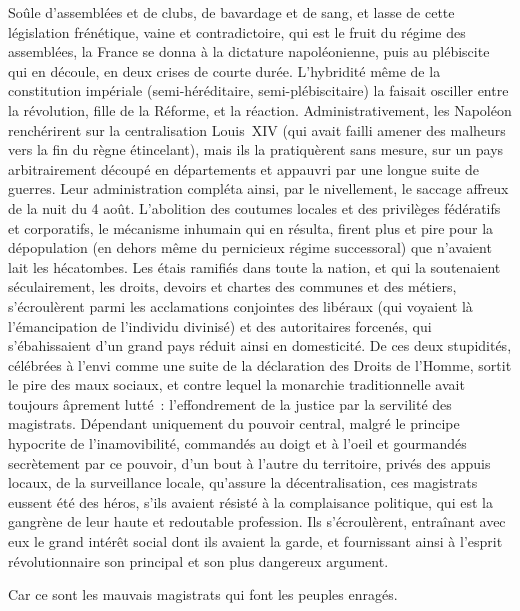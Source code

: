 \documentclass[french,twoside]{book} %
\begin{document}
Soûle d’assemblées et de clubs, de bavardage et de sang, et lasse de cette législation frénétique, vaine et contradictoire, qui est le fruit du régime des assemblées, la France se donna à la dictature napoléonienne, puis au plébiscite qui en découle, en deux crises de courte durée. L’hybridité même de la constitution impériale (semi-héréditaire, semi-plébiscitaire) la faisait osciller entre la révolution, fille de la Réforme, et la réaction. Administrativement, les Napoléon renchérirent sur la centralisation Louis XIV (qui avait failli amener des malheurs vers la fin du règne étincelant), mais ils la pratiquèrent sans mesure, sur un pays arbitrairement découpé en départements et appauvri par une longue suite de guerres. Leur administration compléta ainsi, par le nivellement, le saccage affreux de la nuit du 4 août. L’abolition des coutumes locales et des privilèges fédératifs et corporatifs, le mécanisme inhumain qui en résulta, firent plus et pire pour la dépopulation (en dehors même du pernicieux régime successoral) que n’avaient lait les hécatombes. Les étais ramifiés dans toute la nation, et qui la soutenaient séculairement, les droits, devoirs et chartes des communes et des métiers, s’écroulèrent parmi les acclamations conjointes des libéraux (qui voyaient là l’émancipation de l’individu divinisé) et des autoritaires forcenés, qui s’ébahissaient d’un grand pays réduit ainsi en domesticité. De ces deux stupidités, célébrées à l’envi comme une suite de la déclaration des Droits de l’Homme, sortit le pire des maux sociaux, et contre lequel la monarchie traditionnelle avait toujours âprement lutté : l’effondrement de la justice par la servilité des magistrats. Dépendant uniquement du pouvoir central, malgré le principe hypocrite de l’inamovibilité, commandés au doigt et à l’oeil et gourmandés secrètement par ce pouvoir, d’un bout à l’autre du territoire, privés des appuis locaux, de la surveillance locale, qu’assure la décentralisation, ces magistrats eussent été des héros, s’ils avaient résisté à la complaisance politique, qui est la gangrène de leur haute et redoutable profession. Ils s’écroulèrent, entraînant avec eux le grand intérêt social dont ils avaient la garde, et fournissant ainsi à l’esprit révolutionnaire son principal et son plus dangereux argument.\par
Car ce sont les mauvais magistrats qui font les peuples enragés.\par
\end{document}

